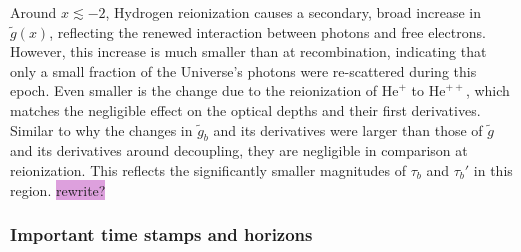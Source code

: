 \documentclass{aa}
\begin{document}
Around $x \lesssim -2$, Hydrogen reionization causes a secondary, broad increase in $ \tilde{g}(x)$, reflecting the renewed interaction between photons and free electrons. However, this increase is much smaller than at recombination, indicating that only a small fraction of the Universe's photons were re-scattered during this epoch. Even smaller is the change due to the reionization of $\text{He}^{+}$ to $\text{He}^{++}$, which matches the negligible effect on the optical depths and their first derivatives. Similar to why the changes in $\tilde{g}_b$ and its derivatives were larger than those of $\tilde{g}$ and its derivatives around decoupling, they are negligible in comparison at reionization. This reflects the significantly smaller magnitudes of $\tau_b$ and $\tau_b'$ in this region. \colorbox{Plum}{rewrite?}



\subsubsection{Important time stamps and horizons}
\end{document}
